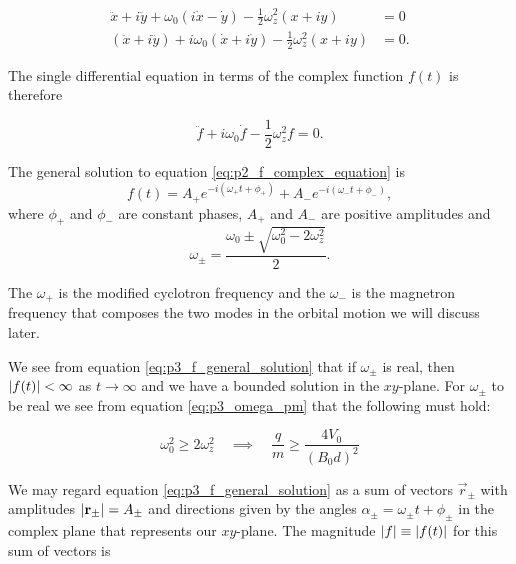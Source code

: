 \begin{align}
    \ddot{x} + i\ddot{y} + \omega_0(i\dot{x} - \dot{y}) -\frac{1}{2}\omega_z^2(x+iy) &= 0 \nonumber \\
    (\ddot{x} + i\ddot{y}) + i\omega_0(\dot{x} +i \dot{y}) -\frac{1}{2}\omega_z^2(x+iy) &= 0. \label{eq:p2_eom_rewritten}
\end{align}

The single differential equation in terms of the complex function $f(t)$ is therefore

\begin{equation}
    \ddot{f} + i\omega_0 \dot{f} - \frac{1}{2}\omega_z^2 f = 0. \label{eq:p2_f_complex_equation}
\end{equation}

The general solution to equation \eqref{eq:p2_f_complex_equation} is 
\begin{equation}
    f(t) = A_+ e^{-i(\omega_+ t + \phi_+)} + A_- e^{-i(\omega_- t + \phi_-)}, \label{eq:p3_f_general_solution}
\end{equation}
where $\phi_+$ and $\phi_-$ are constant phases, $A_+$ and $A_-$ are positive amplitudes and 
\begin{equation}
    \omega_\pm = \frac{\omega_0 \pm \sqrt{\omega_0^2 - 2\omega_z^2}}{2}. \label{eq:p3_omega_pm}
\end{equation}

The $\omega_+$ is the modified cyclotron frequency and the $\omega_-$ is the magnetron frequency that composes the two modes in the orbital motion we will discuss later.


We see from equation \eqref{eq:p3_f_general_solution} that if $\omega_\pm$ is real, then $\abs{f(t)} < \infty$ as $t\to\infty$ and we have a bounded solution in the $xy$-plane. For $\omega_\pm$ to be real we see from equation \eqref{eq:p3_omega_pm} that the following must hold:

\begin{equation}\label{eq:p3_omega_constraints}
    \omega_0^2 \geq 2\omega_z^2  \quad \implies \quad \frac{q}{m} \geq \frac{4V_0}{(B_0d)^2}
\end{equation} 

We may regard equation \eqref{eq:p3_f_general_solution} as a sum of vectors $\vec{r}_\pm$ with amplitudes $\abs{\mathbf{r}_\pm}=A_\pm$ and directions given by the angles $\alpha_\pm = \omega_\pm t + \phi_\pm$ in the complex plane that represents our $xy$-plane. The magnitude $\abs{f} \equiv \abs{f(t)}$ for this sum of vectors is

